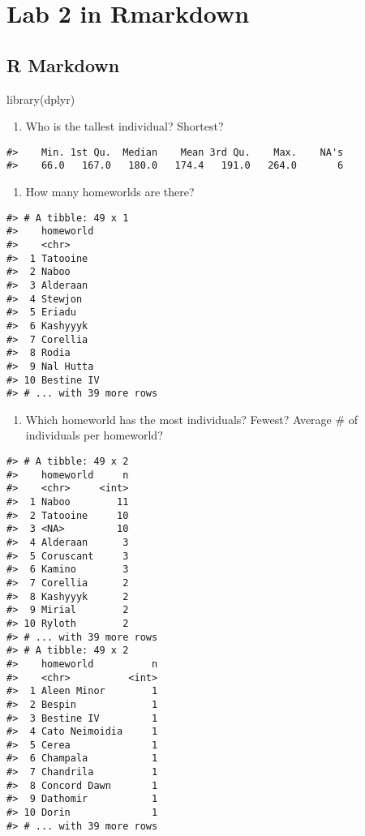 \documentclass[
]{book}
\newenvironment{Shaded}{\begin{snugshade}}{\end{snugshade}}
\newcommand{\FunctionTok}[1]{\textcolor[rgb]{0.00,0.00,0.00}{#1}}
\newcommand{\NormalTok}[1]{#1}
\providecommand{\tightlist}{%
  \setlength{\itemsep}{0pt}\setlength{\parskip}{0pt}}
\begin{document}
\hypertarget{lab-2-in-rmarkdown}{%
\chapter{Lab 2 in Rmarkdown}\label{lab-2-in-rmarkdown}}

\hypertarget{r-markdown}{%
\section{R Markdown}\label{r-markdown}}

\begin{Shaded}
\begin{Highlighting}[]
\FunctionTok{library}\NormalTok{(dplyr)}
\end{Highlighting}
\end{Shaded}

\begin{enumerate}
\def\labelenumi{\arabic{enumi}.}
\tightlist
\item
  Who is the tallest individual? Shortest?
\end{enumerate}

\begin{verbatim}
#>    Min. 1st Qu.  Median    Mean 3rd Qu.    Max.    NA's 
#>    66.0   167.0   180.0   174.4   191.0   264.0       6
\end{verbatim}

\begin{enumerate}
\def\labelenumi{\arabic{enumi}.}
\setcounter{enumi}{1}
\tightlist
\item
  How many homeworlds are there?
\end{enumerate}

\begin{verbatim}
#> # A tibble: 49 x 1
#>    homeworld 
#>    <chr>     
#>  1 Tatooine  
#>  2 Naboo     
#>  3 Alderaan  
#>  4 Stewjon   
#>  5 Eriadu    
#>  6 Kashyyyk  
#>  7 Corellia  
#>  8 Rodia     
#>  9 Nal Hutta 
#> 10 Bestine IV
#> # ... with 39 more rows
\end{verbatim}

\begin{enumerate}
\def\labelenumi{\arabic{enumi}.}
\setcounter{enumi}{2}
\tightlist
\item
  Which homeworld has the most individuals? Fewest? Average \# of individuals per homeworld?
\end{enumerate}

\begin{verbatim}
#> # A tibble: 49 x 2
#>    homeworld     n
#>    <chr>     <int>
#>  1 Naboo        11
#>  2 Tatooine     10
#>  3 <NA>         10
#>  4 Alderaan      3
#>  5 Coruscant     3
#>  6 Kamino        3
#>  7 Corellia      2
#>  8 Kashyyyk      2
#>  9 Mirial        2
#> 10 Ryloth        2
#> # ... with 39 more rows
#> # A tibble: 49 x 2
#>    homeworld          n
#>    <chr>          <int>
#>  1 Aleen Minor        1
#>  2 Bespin             1
#>  3 Bestine IV         1
#>  4 Cato Neimoidia     1
#>  5 Cerea              1
#>  6 Champala           1
#>  7 Chandrila          1
#>  8 Concord Dawn       1
#>  9 Dathomir           1
#> 10 Dorin              1
#> # ... with 39 more rows
\end{verbatim}
\end{document}
